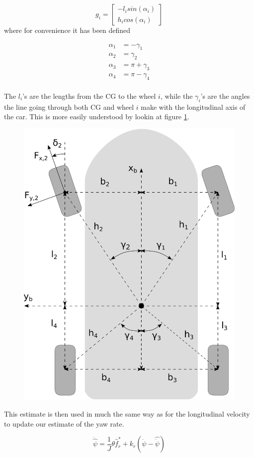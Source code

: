 \begin{equation}
    g_i = \begin{bmatrix} -l_i sin(\alpha_i) \\ h_i cos(\alpha_i)
    \end{bmatrix}
\end{equation}
where for convenience it has been defined

\begin{align}
    \alpha_1 & = -\gamma_1 \\
    \alpha_2 & = \gamma_2 \\
    \alpha_3 & = \pi + \gamma_3 \\
    \alpha_4 & = \pi -\gamma_4 \\
\end{align}

The $l_i$'s are the lengths from the CG to the wheel $i$, while the $\gamma_i$'s are the angles the line going through both CG and wheel $i$ make with the longitudinal axis of the car. This is more easily understood by lookin at figure \ref{Fig:WheelTorques}. 

\begin{figure}
    \centering
    \includegraphics[width=0.5\linewidth]{0_Images/3_Theory/TorqueCalculations.eps}
    \label{Fig:WheelTorques}
\end{figure}

This estimate is then used in much the same way as for the longitudinal velocity to update our estimate of the yaw rate.

\begin{equation}
    \ddot{\hat{\psi}} = \frac{1}{J}\theta \hat{f}_r^* + k_r(\dot{\psi}-\hat{\dot{\psi}})
\end{equation}

